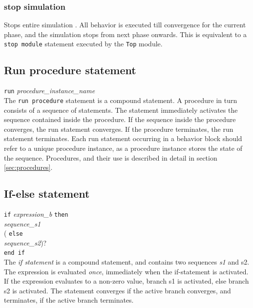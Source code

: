 \documentclass[12pt,a4paper]{report}
\begin{document}
	
	\subsubsection{stop simulation}
	Stops entire simulation . All behavior
	is executed till convergence for the current phase, and the 
	simulation stops from next phase onwards. This is equivalent to  
	a \texttt{stop module} statement executed by the \texttt{Top} module.

	
	\subsection{Run procedure statement}
		\texttt{run} \textit{procedure\_instance\_name}\\

	The \texttt{run procedure} statement is a compound statement.
	A procedure in turn consists of a sequence of statements.
	The statement immediately activates the sequence contained inside
	the procedure. If the sequence inside the procedure converges,
	the run statement converges. If the procedure terminates, 
	the run statement terminates. Each run statement 
	occurring in a behavior block should refer to a unique procedure instance,
	as a procedure instance stores the state of the sequence.
	Procedures, and their use is described in detail in section \ref{sec:procedures}.


	\subsection{If-else statement}
	\texttt{if}  \textit{expression\_b} \texttt{then}\\
	\hspace{1 cm}\textit{sequence\_s1}\\
	( \texttt{else}\\
	\hspace{1 cm}\textit{sequence\_s2})? \\
	\texttt{end if}\\
	
	
	The \textit{if statement} is a compound statement, and contains two sequences \textit{s1} and {s2}.
	The expression is evaluated \emph{once}, immediately when the if-statement is activated. 
	If the expression evaluates to a non-zero value, branch s1 is activated, else branch s2 is activated.
	The statement converges if the active branch converges, and terminates, if the active branch terminates.\\
\end{document}

